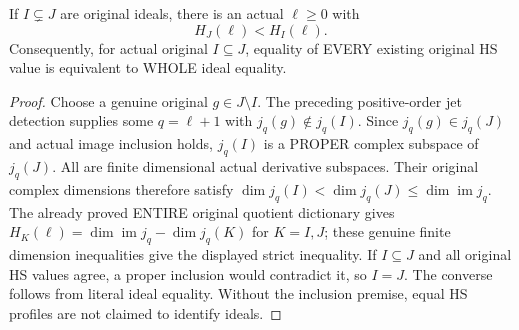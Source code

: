 \begin{theorem}
\label{hir:actual-proper-ideal-inclusion-finite-hs-separation}
\leanok
If $I\subsetneq J$ are original ideals, there is an actual $\ell\ge0$
with
\[
 H_J(\ell)<H_I(\ell).
\]
Consequently, for actual original $I\subseteq J$, equality of EVERY
existing original HS value is equivalent to WHOLE ideal equality.
\end{theorem}
\begin{proof}
Choose a genuine original $g\in J\setminus I$. The preceding
positive-order jet detection supplies some $q=\ell+1$ with
$j_q(g)\notin j_q(I)$. Since $j_q(g)\in j_q(J)$ and actual image
inclusion holds, $j_q(I)$ is a PROPER complex subspace of $j_q(J)$.
All are finite dimensional actual derivative subspaces. Their original
complex dimensions therefore satisfy
$\dim j_q(I)<\dim j_q(J)\le\dim\operatorname{im}j_q$.
The already proved ENTIRE original quotient dictionary gives
$H_K(\ell)=\dim\operatorname{im}j_q-\dim j_q(K)$ for $K=I,J$;
these genuine finite dimension inequalities give the displayed strict
inequality. If $I\subseteq J$ and all original HS values agree, a proper
inclusion would contradict it, so $I=J$. The converse follows from literal
ideal equality. Without the inclusion premise, equal HS profiles are not
claimed to identify ideals.
\end{proof}

